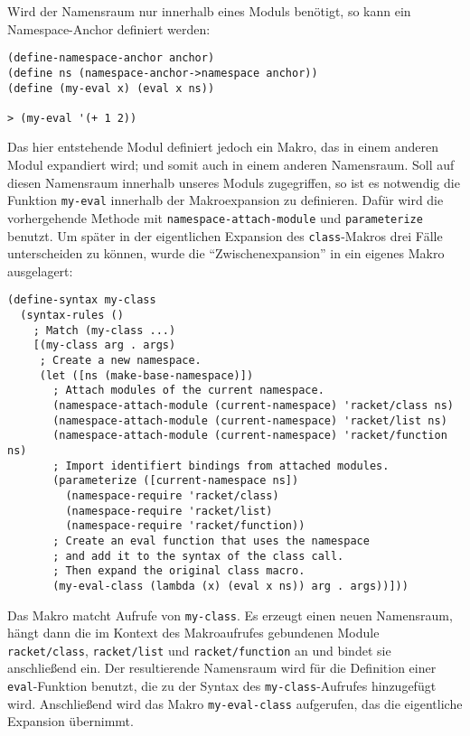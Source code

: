 Wird der Namensraum nur innerhalb eines Moduls benötigt, so kann ein Name\-space-An\-chor definiert werden:

\begin{lstlisting}
(define-namespace-anchor anchor)
(define ns (namespace-anchor->namespace anchor))
(define (my-eval x) (eval x ns))

> (my-eval '(+ 1 2))
\end{lstlisting}
{}

Das hier entstehende Modul definiert jedoch ein Makro, das in einem anderen Modul expandiert wird; und somit auch in einem anderen Namensraum. Soll auf diesen Namensraum innerhalb unseres Moduls zugegriffen, so ist es notwendig die Funktion \texttt{my-eval} innerhalb der Makroexpansion zu definieren. Dafür wird die vorhergehende Methode mit \texttt{namespace-attach-module} und \texttt{parameterize} benutzt. Um später in der eigentlichen Expansion des \texttt{class}-Makros drei Fälle unterscheiden zu können, wurde die ``Zwischenexpansion'' in ein eigenes Makro ausgelagert:

\begin{lstlisting}
(define-syntax my-class
  (syntax-rules ()
    ; Match (my-class ...)
    [(my-class arg . args)
     ; Create a new namespace.
     (let ([ns (make-base-namespace)])
       ; Attach modules of the current namespace.
       (namespace-attach-module (current-namespace) 'racket/class ns)
       (namespace-attach-module (current-namespace) 'racket/list ns)
       (namespace-attach-module (current-namespace) 'racket/function ns)
       ; Import identifiert bindings from attached modules.
       (parameterize ([current-namespace ns])
         (namespace-require 'racket/class)
         (namespace-require 'racket/list)
         (namespace-require 'racket/function))
       ; Create an eval function that uses the namespace
       ; and add it to the syntax of the class call.
       ; Then expand the original class macro.
       (my-eval-class (lambda (x) (eval x ns)) arg . args))]))
\end{lstlisting}

Das Makro matcht Aufrufe von \texttt{my-class}. Es erzeugt einen neuen Namensraum, hängt dann die im Kontext des Makroaufrufes gebundenen Module \texttt{racket/class}, \texttt{racket/list} und \texttt{racket/function} an und bindet sie anschließend ein. Der resultierende Namensraum wird für die Definition einer \texttt{eval}-Funktion benutzt, die zu der Syntax des \texttt{my-class}-Aufrufes hinzugefügt wird. Anschließend wird das Makro \texttt{my-eval-class} aufgerufen, das die eigentliche Expansion übernimmt.


